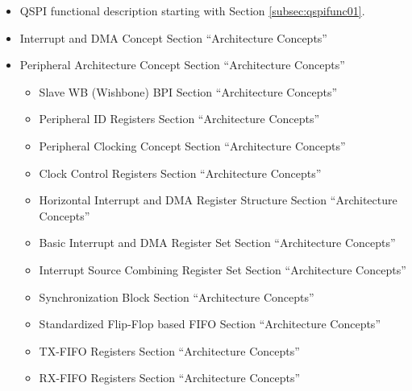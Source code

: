 \begin{itemize}
  \item QSPI functional description starting with Section \ref{subsec:qspifunc01}.
  \item Interrupt and DMA Concept Section ``Architecture Concepts''
  \item Peripheral Architecture Concept Section ``Architecture Concepts''
  \begin{itemize}
    \item Slave WB (Wishbone) BPI Section ``Architecture Concepts''
    \item Peripheral ID Registers Section ``Architecture Concepts''
    \item Peripheral Clocking Concept Section ``Architecture Concepts''
    \item Clock Control Registers Section ``Architecture Concepts''
    \item Horizontal Interrupt and DMA Register Structure Section ``Architecture Concepts''
    \item Basic Interrupt and DMA Register Set Section ``Architecture Concepts''
    \item Interrupt Source Combining Register Set Section ``Architecture Concepts''
    \item Synchronization Block Section ``Architecture Concepts''
    \item Standardized Flip-Flop based FIFO Section ``Architecture Concepts''
    \item TX-FIFO Registers Section ``Architecture Concepts''
    \item RX-FIFO Registers Section ``Architecture Concepts''
  \end{itemize}
\end{itemize}
